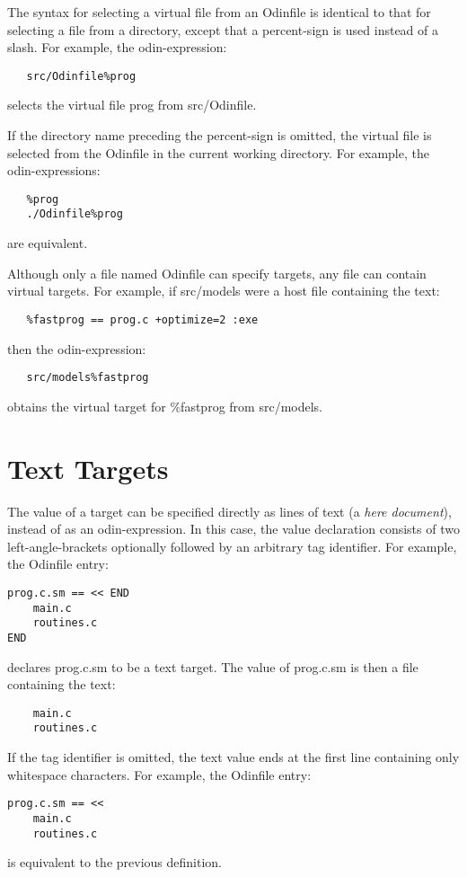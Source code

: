 The syntax for selecting a virtual file from an {\ex Odinfile} is
identical to that for selecting a file from a directory,
except that a percent-sign is used instead of a slash.
For example, the odin-expression:
\begin{verbatim}
   src/Odinfile%prog
\end{verbatim}
selects the virtual file {\ex prog} from {\ex src/Odinfile}.

If the directory name preceding the percent-sign is omitted,
the virtual file is selected from the {\ex Odinfile} in
the current working directory.  For example, the odin-expressions:
\begin{verbatim}
   %prog
   ./Odinfile%prog
\end{verbatim}
are equivalent.

Although only a file named {\ex Odinfile} can specify targets,
any file can contain virtual targets.
For example, if {\ex src/models} were a host file containing the text:
\begin{verbatim}
   %fastprog == prog.c +optimize=2 :exe
\end{verbatim}
then the odin-expression:
\begin{verbatim}
   src/models%fastprog
\end{verbatim}
obtains the virtual target for {\ex \%fastprog} from {\ex src/models}.


\section{Text Targets}
\label{texttarget}

The value of a target can be specified directly as lines of text
(a {\em here document}), instead of as an odin-expression.
In this case, the value declaration consists of
two left-angle-brackets optionally followed by an arbitrary tag identifier.
For example, the {\ex Odinfile} entry:
\begin{verbatim}
prog.c.sm == << END
    main.c
    routines.c
END
\end{verbatim}
declares {\ex prog.c.sm} to be a text target.
The value of {\ex prog.c.sm} is then a file containing the text:
\begin{verbatim}
    main.c
    routines.c
\end{verbatim}

If the tag identifier is omitted, the text value ends at the first line
containing only whitespace characters.
For example, the {\ex Odinfile} entry:
\begin{verbatim}
prog.c.sm == <<
    main.c
    routines.c
\end{verbatim}
is equivalent to the previous definition.

